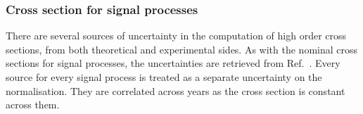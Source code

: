



\subsubsection{Cross section for signal processes}
\label{subsubsec:htoinv_signal_xs_syst}

There are several sources of uncertainty in the computation of high order cross sections, from both theoretical and experimental sides. As with the nominal cross sections for signal processes, the uncertainties are retrieved from Ref.~. Every source for every signal process is treated as a separate uncertainty on the normalisation. They are correlated across years as the cross section is constant across them.
